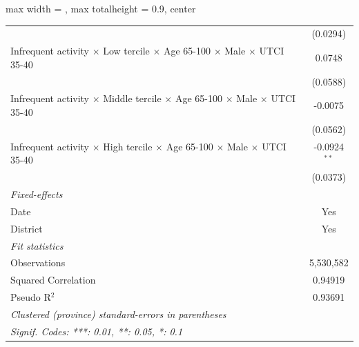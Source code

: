 \begin{table}[htbp]
\begin{adjustbox}{max width = \textwidth, max totalheight = 0.9\textheight, center}
\begin{tabular}{lc}
                                                                                                                 & (0.0294)\\   
         Infrequent activity $\times$ Low tercile $\times$ Age 65-100 $\times$ Male $\times$ UTCI 35-40          & 0.0748\\   
                                                                                                                 & (0.0588)\\   
         Infrequent activity $\times$ Middle tercile $\times$ Age 65-100 $\times$ Male $\times$ UTCI 35-40       & -0.0075\\   
                                                                                                                 & (0.0562)\\   
         Infrequent activity $\times$ High tercile $\times$ Age 65-100 $\times$ Male $\times$ UTCI 35-40         & -0.0924$^{**}$\\   
                                                                                                                 & (0.0373)\\   
         \midrule
         \emph{Fixed-effects}\\
         Date                                                                                                    & Yes\\  
         District                                                                                                & Yes\\  
         \midrule
         \emph{Fit statistics}\\
         Observations                                                                                            & 5,530,582\\  
         Squared Correlation                                                                                     & 0.94919\\  
         Pseudo R$^2$                                                                                            & 0.93691\\  
         \midrule \midrule
         \multicolumn{2}{l}{\emph{Clustered (province) standard-errors in parentheses}}\\
         \multicolumn{2}{l}{\emph{Signif. Codes: ***: 0.01, **: 0.05, *: 0.1}}\\
      \end{tabular}
   \end{adjustbox}
\end{table}


